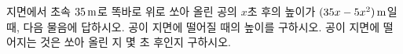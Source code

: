 지면에서 초속 $35\mkern3mu \mathrm{m}$로 똑바로 위로 쏘아 올린 공의 $x$초 후의 높이가 $(35x-5x^2)\mkern3mu \mathrm{m}$일 때, 다음 물음에 답하시오.
 공이 지면에 떨어질 때의 높이를 구하시오.
 공이 지면에 떨어지는 것은 쏘아 올린 지 몇 초 후인지 구하시오.
